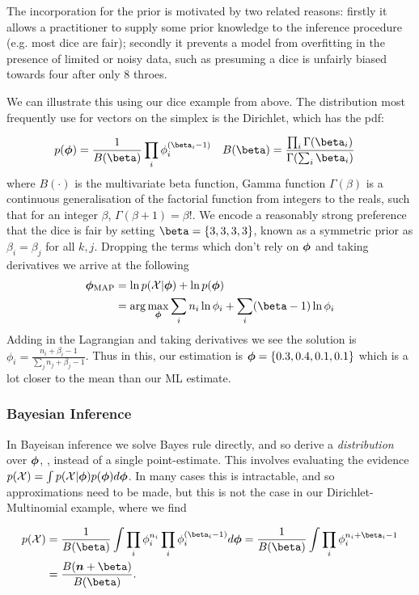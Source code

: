 The incorporation for the prior is motivated by two related reasons: firstly it allows a practitioner to supply some prior knowledge to the inference procedure (e.g. most dice are fair); secondly it prevents a model from overfitting in the presence of limited or noisy data, such as presuming a dice is unfairly biased towards four after only 8 throes.

We can illustrate this using our dice example from above. The distribution most frequently use for vectors on the simplex is the Dirichlet, which has the pdf:

\begin{align*}
p(\param) & = \oneover{B(\vv{\beta})} \prod_i \phi_i^{(\beta_i - 1)} &
B(\vv{\beta}) & = \frac{\prod_i \Gamma(\beta_i)}{\Gamma(\sum_i \beta_i)}
\end{align*}
where $B(\cdot)$ is the multivariate beta function, Gamma function $\Gamma(\beta)$ is a continuous generalisation of the factorial function from integers to the reals, such that for an integer $\beta$, $\Gamma(\beta + 1) = \beta!$. We encode a reasonably strong preference that the dice is fair by setting $\vv{\beta} = \{ 3, 3, 3, 3 \}$, known as a symmetric prior as $\beta_i = \beta_j$ for all $k, j$. Dropping the terms which don't rely on ${ \bm \phi }$ and taking derivatives we arrive at the following
\begin{align}
\map{\param} & = \ln p(\xdat|\param) + \ln p(\param) \\
 &= \arg \max_\param \sum_i n_i \ln \phi_i + \sum_i (\beta-1) \ln \phi_i
\end{align}
Adding in the Lagrangian and taking derivatives we see the solution is $\phi_i = \frac{n_i + \beta_i - 1}{\sum_j n_j + \beta_j - 1}$. Thus in this, our estimation is ${ \bm \phi } = \{0.3, 0.4, 0.1, 0.1\} $ which is a lot closer to the mean than our ML estimate.

\subsubsection*{Bayesian Inference}
In Bayeisan inference we solve Bayes rule directly, and so derive a \emph{distribution} over ${ \bm \phi }$,  , instead of a single point-estimate. This involves evaluating the evidence $p({ \mathcal{X} }) = \int p({ \mathcal{X} } | { \bm \phi }) p({ \bm \phi }) d{ \bm \phi }$. In many cases this is intractable, and so approximations need to be made, but this is not the case in our Dirichlet-Multinomial example, where we find

\begin{align*}
p(\xdat) & = \frac{1}{B(\beta)} \int \prod_i \phi_i^{n_i} \prod_i \phi_i^{(\beta_i - 1)} d\param  = \frac{1}{B(\beta)} \int \prod_i \phi_i^{n_i + \beta_i - 1} \\
& = \frac{B(\vv{n} + \vv{\beta})}{B(\vv{\beta})}.
\end{align*}

